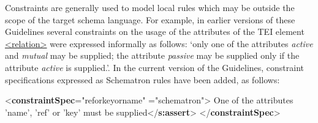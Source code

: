 Constraints are generally used to model local rules which may be outside the scope of the target schema language. For example, in earlier versions of these Guidelines several constraints on the usage of the attributes of the TEI element \hyperref[TEI.relation]{<relation>} were expressed informally as follows: ‘only one of the attributes {\itshape active} and {\itshape mutual} may be supplied; the attribute {\itshape passive} may be supplied only if the attribute {\itshape active} is supplied.’. In the current version of the Guidelines, constraint specifications expressed as Schematron rules have been added, as follows: \par\bgroup{}\exampleFont \begin{shaded}\noindent\mbox{}{<\textbf{constraintSpec}\hspace*{1em}{ident}="{reforkeyorname}"\mbox{}\newline 
\hspace*{1em}{scheme}="{schematron}">}\mbox{}\newline 
{}\mbox{}\newline 
\hspace*{1em}One of the\mbox{}\newline 
\hspace*{1em}\hspace*{1em}\hspace*{1em}\hspace*{1em} attributes 'name', 'ref' or 'key' must be supplied{</\textbf{s:assert}>}\mbox{}\newline 
{}\mbox{}\newline 
{</\textbf{constraintSpec}>}\mbox{}\newline 

\end{shaded}
